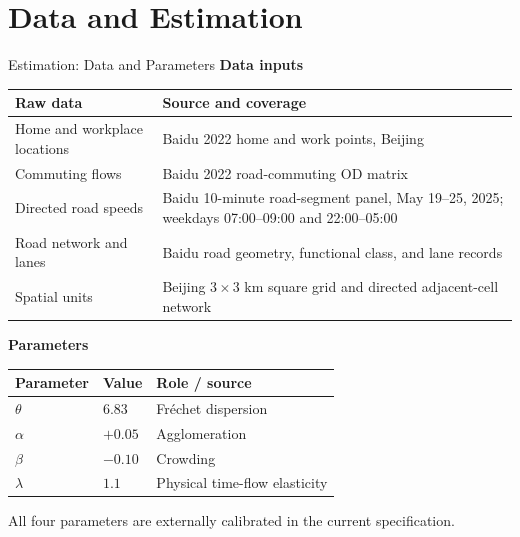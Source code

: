 \documentclass[11pt,aspectratio=169]{beamer}
\newcommand{\app}[1]{\allowbreak\hspace{0.25em}\hyperlink{#1}{\beamergotobutton{details}}}
\begin{document}
\section{Data and Estimation}\label{sec:quant}
\begin{frame}[label=estparams]{Estimation: Data and Parameters}
\small\textbf{Data inputs}\par
\vspace{0.25em}
\scriptsize
\begin{tabularx}{0.94\textwidth}{@{}p{}X@{}}
\toprule
Raw data & Source and coverage \tabularnewline
\midrule
Home and workplace locations & Baidu 2022 home and work points, Beijing \tabularnewline
Commuting flows & Baidu 2022 road-commuting OD matrix \tabularnewline
Directed road speeds & Baidu 10-minute road-segment panel, May 19--25, 2025; weekdays 07:00--09:00 and 22:00--05:00 \tabularnewline
Road network and lanes & Baidu road geometry, functional class, and lane records \tabularnewline
Spatial units & Beijing $3\times3$ km square grid and directed adjacent-cell network \tabularnewline
\bottomrule
\end{tabularx}

\vspace{0.80em}
\small\textbf{Parameters}\par
\vspace{0.25em}
\scriptsize
\begin{tabularx}{0.94\textwidth}{@{}p{}p{}X@{}}
\toprule
Parameter & Value & Role / source \tabularnewline
\midrule
$\theta$ & $6.83$ & Fr\'echet dispersion \citep{ahlfeldt2015} \tabularnewline
$\alpha$ & $+0.05$ & Agglomeration \tabularnewline
$\beta$ & $-0.10$ & Crowding \tabularnewline
$\lambda$ & $1.1$ & Physical time-flow elasticity \citep{barwick2024} \tabularnewline
\bottomrule
\end{tabularx}
\vspace{0.30em}

{\tiny\color{gray!80} All four parameters are externally calibrated in the current specification. \app{appparams}}
\end{frame}
\end{document}
